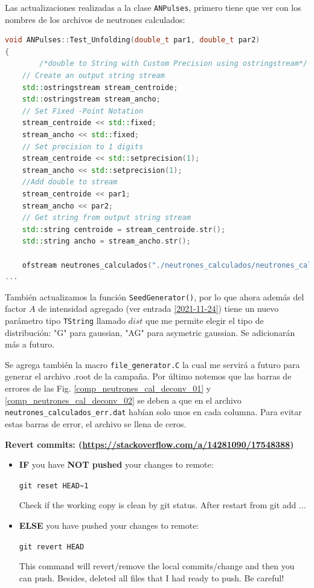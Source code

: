 \documentclass[11pt,letterpaper]{article}
\begin{document}
Las actualizaciones realizadas a la clase \verb|ANPulses|, primero tiene que ver con los nombres de los archivos de neutrones calculados:

\begin{lstlisting}[language=C++]
void ANPulses::Test_Unfolding(double_t par1, double_t par2)
{
		/*double to String with Custom Precision using ostringstream*/
	// Create an output string stream
	std::ostringstream stream_centroide;
	std::ostringstream stream_ancho;
	// Set Fixed -Point Notation
	stream_centroide << std::fixed;
	stream_ancho << std::fixed;
	// Set precision to 1 digits
	stream_centroide << std::setprecision(1);
	stream_ancho << std::setprecision(1);
	//Add double to stream
	stream_centroide << par1;
	stream_ancho << par2;
	// Get string from output string stream
	std::string centroide = stream_centroide.str();
	std::string ancho = stream_ancho.str();
	
	ofstream neutrones_calculados("./neutrones_calculados/neutrones_calculados_C"+centroide+"_S"+ancho+".dat"); // archivo de salida
...
\end{lstlisting}

También actualizamos la función \verb|SeedGenerator()|, por lo que ahora además del factor $A$ de intensidad agregado (ver entrada \ref{2021-11-24}) tiene un nuevo parámetro tipo \verb|TString| llamado $dist$ que me permite elegir el tipo de distribución: "G" para gaussian, "AG" para asymetric gaussian. Se adicionarán más a futuro.

Se agrega también la macro \verb|file_generator.C| la cual me servirá a futuro para generar el archivo .root de la campaña. 
Por último notemos que las barras de errores de las Fig. \ref{comp_neutrones_cal_deconv_01}  y \ref{comp_neutrones_cal_deconv_02} se deben a que en el archivo \verb|neutrones_calculados_err.dat| habían solo unos en cada columna. Para evitar estas barras de error, el archivo se llena de ceros.

\begin{tipt}
\textbf{Revert commits: (\url{https://stackoverflow.com/a/14281090/17548388})}
\begin{itemize}
\item[•]\textbf{IF} you have \textbf{NOT pushed} your changes to remote:
 
\verb|git reset HEAD~1|

Check if the working copy is clean by git status. After restart from git add ...

\item[•] \textbf{ELSE} you have pushed your changes to remote: 

\verb|git revert HEAD|	

This command will revert/remove the local commits/change and then you can push. Besides, deleted all files that I had ready to push. Be careful!
\end{itemize}

\end{tipt}
\end{document}

